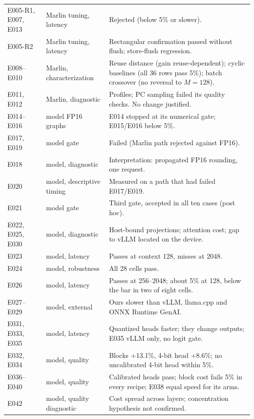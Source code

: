 \documentclass[sigconf,nonacm]{acmart}
\begin{document}
\begin{table}[t]
\begin{tabular}{p{}p{}p{}}
E005-R1, E007, E013 & Marlin tuning, latency & Rejected (below 5\% or slower). \\
E005-R2 & Marlin tuning, latency & Rectangular confirmation passed without flush; store-flush regression. \\
E008--E010 & Marlin, characterization & Reuse distance (gain reuse-dependent); cyclic baselines (all 36 rows pass 5\%); batch crossover (no reversal to $M=128$). \\
E011, E012 & Marlin, diagnostic & Profiles; PC sampling failed its quality checks. No change justified. \\
E014--E016 & model FP16 graphs & E014 stopped at its numerical gate; E015/E016 below 5\%. \\
E017, E019 & model gate & Failed (Marlin path rejected against FP16). \\
E018 & model, diagnostic & Interpretation: propagated FP16 rounding, one request. \\
E020 & model, descriptive timing & Measured on a path that had failed E017/E019. \\
E021 & model gate & Third gate, accepted in all ten cases (post hoc). \\
E022, E025, E030 & model, diagnostic & Host-bound projections; attention cost; gap to vLLM located on the device. \\
E023 & model, latency & Passes at context 128, misses at 2048. \\
E024 & model, robustness & All 28 cells pass. \\
E026 & model, latency & Passes at 256--2048; about 5\% at 128, below the bar in two of eight cells. \\
E027--E029 & model, external & Ours slower than vLLM, llama.cpp and ONNX Runtime GenAI. \\
E031, E033, E035 & model, latency & Quantized heads faster; they change outputs; E035 vLLM only, no logit gate. \\
E032, E034 & model, quality & Blocks +13.1\%, 4-bit head +8.6\%; no uncalibrated 4-bit head within 5\%. \\
E036--E040 & model, quality & Calibrated heads pass; block cost fails 5\% in every recipe; E038 equal speed for its arms. \\
E042 & model, quality diagnostic & Cost spread across layers; concentration hypothesis not confirmed. \\
\bottomrule
\end{tabular}
\end{table}



\end{document}
